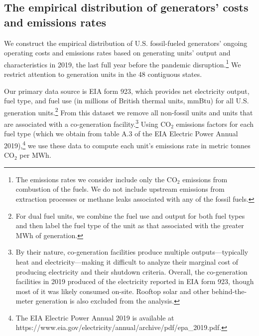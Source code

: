 \documentclass[12pt]{article}
\begin{document}
\subsection{The empirical distribution of generators' costs and emissions rates}\label{sec:data}

We construct the empirical distribution of U.S. fossil-fueled generators' ongoing operating costs and emissions rates based on generating units' output and characteristics in 2019, the last full year before the pandemic disruption.\footnote{The emissions rates we consider include only the CO$_2$ emissions from combustion of the fuels. We do not include upstream emissions from extraction processes or methane leaks associated with any of the fossil fuels.} We restrict attention to generation units in the 48 contiguous states.

Our primary data source is EIA form 923, which provides net electricity output, fuel type, and fuel use (in millions of British thermal units, mmBtu) for all U.S. generation units.\footnote{For dual fuel units, we combine the fuel use and output for both fuel types and then label the fuel type of the unit as that associated with the greater MWh of generation.} From this dataset we remove all non-fossil units and units that are associated with a co-generation facility.\footnote{By their nature, co-generation facilities produce multiple outputs---typically heat and electricity---making it difficult to analyze their marginal cost of producing electricity and their shutdown criteria. Overall, the co-generation facilities in 2019 produced of the electricity reported in EIA form 923, though most of it was likely consumed on-site.  Rooftop solar and other behind-the-meter generation is also excluded from the analysis.} Using CO$_2$ emissions factors for each fuel type (which we obtain from table A.3 of the EIA Electric Power Annual 2019),\footnote{The EIA Electric Power Annual 2019 is available at https://www.eia.gov/electricity/annual/archive/pdf/epa\_2019.pdf.} we use these data to compute each unit's emissions rate in metric tonnes CO$_2$ per MWh. 
\end{document}
